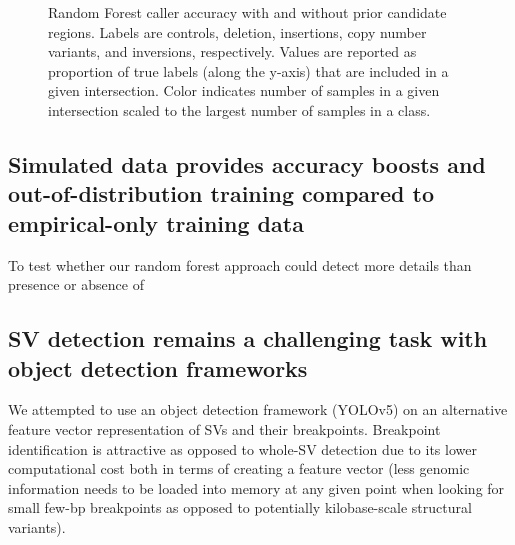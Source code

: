 \begin{figure}
    \centering
    \caption[Random Forest caller accuracy with and without prior candidate regions.]{Random Forest caller accuracy with and without prior candidate regions. Labels are controls, deletion, insertions, copy number variants, and inversions, respectively. Values are reported as proportion of true labels (along the y-axis) that are included in a given intersection. Color indicates number of samples in a given intersection scaled to the largest number of samples in a class.}
    \label{fig:caller_comparison}
\end{figure}

\subsection{Simulated data provides accuracy boosts and out-of-distribution training compared to empirical-only training data}

To test whether our random forest approach could detect more details than presence or absence of 

\subsection{SV detection remains a challenging task with object detection frameworks}

We attempted to use an object detection framework (YOLOv5) on an alternative feature vector representation of SVs and their breakpoints. Breakpoint identification is attractive as opposed to whole-SV detection due to its lower computational cost both in terms of creating a feature vector (less genomic information needs to be loaded into memory at any given point when looking for small few-bp breakpoints as opposed to potentially kilobase-scale structural variants).

